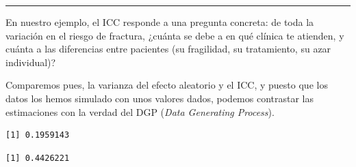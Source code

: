 \documentclass[
  letterpaper,
  DIV=11,
  numbers=noendperiod]{scrartcl}
\newenvironment{Shaded}{\begin{snugshade}}{\end{snugshade}}
\newcommand{\CommentTok}[1]{\textcolor[rgb]{0.37,0.37,0.37}{#1}}
\newcommand{\DecValTok}[1]{\textcolor[rgb]{0.68,0.00,0.00}{#1}}
\newcommand{\FunctionTok}[1]{\textcolor[rgb]{0.28,0.35,0.67}{#1}}
\newcommand{\NormalTok}[1]{\textcolor[rgb]{0.00,0.23,0.31}{#1}}
\newcommand{\OtherTok}[1]{\textcolor[rgb]{0.00,0.23,0.31}{#1}}
\newcommand{\SpecialCharTok}[1]{\textcolor[rgb]{0.37,0.37,0.37}{#1}}
\begin{document}
\begin{center}\rule{0.5\linewidth}{0.5pt}\end{center}

En nuestro ejemplo, el ICC responde a una pregunta concreta: de toda la
variación en el riesgo de fractura, ¿cuánta se debe a en qué clínica te
atienden, y cuánta a las diferencias entre pacientes (su fragilidad, su
tratamiento, su azar individual)?

Comparemos pues, la varianza del efecto aleatorio y el ICC, y puesto que
los datos los hemos simulado con unos valores dados, podemos contrastar
las estimaciones con la verdad del DGP (\emph{Data Generating Process}).

\begin{Shaded}
\end{Shaded}

\begin{verbatim}
[1] 0.1959143
\end{verbatim}

\begin{Shaded}
\end{Shaded}

\begin{verbatim}
[1] 0.4426221
\end{verbatim}

\begin{Shaded}
\end{Shaded}
\end{document}
